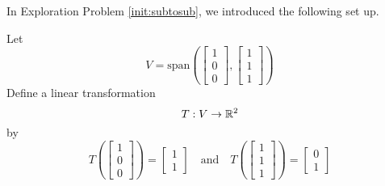 \documentclass{ximera}
\begin{document}
\begin{example}\label{ex:inversematrixoftransform}
In Exploration Problem \ref{init:subtosub}, we introduced the following set up.

Let $$V=\text{span}\left(\begin{bmatrix}1\\0\\0\end{bmatrix}, \begin{bmatrix}1\\1\\1\end{bmatrix}\right)$$
Define a linear transformation $$T:V\rightarrow \mathbb{R}^2$$
by $$T\left(\begin{bmatrix}1\\0\\0\end{bmatrix}\right)=\begin{bmatrix}1\\1\end{bmatrix}\quad \text{and} \quad T\left(\begin{bmatrix}1\\1\\1\end{bmatrix}\right)=\begin{bmatrix}0\\1\end{bmatrix}$$


\end{example}
\end{document}
